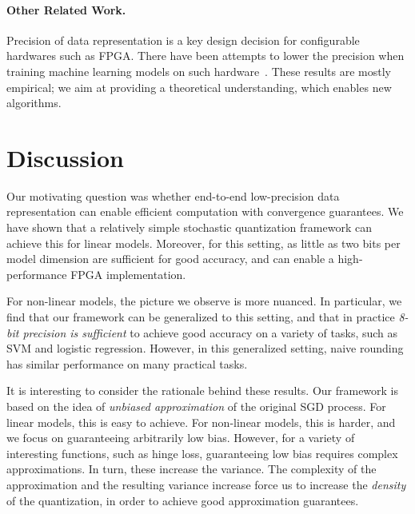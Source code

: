 \documentclass{article}
\begin{document}
\vspace{-1.2em}
\paragraph{Other Related Work.} Precision of data
representation is a key design decision
for configurable hardwares such as FPGA. There have been attempts to
lower the precision when training machine learning models
on such hardware~\cite{Kim:2011:ICASSP}. 
These results are mostly empirical; we
aim at providing a theoretical understanding, which 
enables new algorithms.

\vspace{-1em}
\section{Discussion}
\label{sec:conclusions}

\vspace{-0.5em}
Our motivating question was whether end-to-end low-precision data representation can enable efficient computation with convergence guarantees. 
We have shown that a relatively simple stochastic quantization framework can achieve this for linear models. 
Moreover, for this setting, as little as two bits per model dimension are sufficient for good accuracy, and can enable a high-performance FPGA implementation.  

\vspace{-0.3em}
For non-linear models, the picture we observe is more nuanced. 
In particular, we find that our framework can be generalized to this setting, and that in practice \emph{8-bit precision is sufficient} to achieve good accuracy on a variety of tasks, such as SVM and logistic regression. 
However, in this generalized setting, naive rounding has similar performance on many practical tasks. 

\vspace{-0.3em}
It is interesting to consider the rationale behind these results. Our framework is based on the idea of \emph{unbiased approximation} of the original SGD process. For linear models, this is easy to achieve. For non-linear models, this is harder, and we  focus on guaranteeing arbitrarily low bias. 
However, for a variety of interesting functions, such as hinge loss, guaranteeing low bias requires complex approximations. In turn, these increase the variance. The complexity of the approximation and the resulting variance increase force us to increase the \emph{density} of the quantization, in order to achieve good approximation guarantees. 
\end{document}
